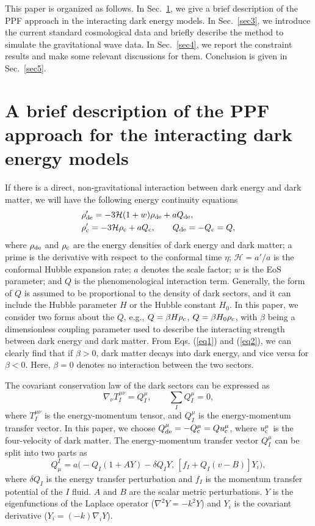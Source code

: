 \documentclass[aps,prd,nofootinbib,amsmath,amssymb,superscriptaddress,twocolumn,10pt]{revtex4}%
\begin{document}
This paper is organized as follows. In Sec.~\ref{sec2}, we give a brief description of the PPF approach in the interacting dark energy models. In Sec.~\ref{sec3}, we introduce the current standard cosmological data and briefly describe the method to simulate the gravitational wave data. In Sec.~\ref{sec4}, we report the constraint results and make some relevant discussions for them. Conclusion is given in Sec.~\ref{sec5}.


\section{A brief description of the PPF approach for the interacting dark energy models}\label{sec2}

If there is a direct, non-gravitational interaction between dark energy and dark matter, we will have the following energy continuity equations
\begin{align}
&\rho'_{\rm de} = -3\mathcal{H}(1+w)\rho_{\rm de}+ aQ_{\rm de},\label{eq1}\\
&\rho'_{\rm c} = -3\mathcal{H}\rho_{\rm c}+aQ_{\rm c},~~~~~~Q_{\rm de}=-Q_{\rm c}=Q,\label{eq2}
\end{align}
where $\rho_{\rm de}$ and $\rho_{\rm c}$ are the energy densities of dark energy and dark matter; a prime is the derivative with respect to the conformal time $\eta$; $\mathcal{H}=a'/a$ is the conformal Hubble expansion rate; $a$ denotes the scale factor; $w$ is the EoS parameter; and $Q$ is the phenomenological interaction term. Generally, the form of $Q$ is assumed to be proportional to the density of dark sectors, and it can include the Hubble parameter $H$ or the Hubble constant $H_{0}$. In this paper, we consider two forms about the $Q$, e.g., $Q=\beta H \rho_{\rm c}$, $Q=\beta H_{0} \rho_{\rm c}$,  with $\beta$ being a dimensionless coupling parameter used to describe the interacting strength between dark energy and dark matter. From Eqs. (\ref{eq1}) and (\ref{eq2}), we can clearly find that if $\beta>0$, dark matter decays into dark energy, and vice versa for $\beta<0$. Here, $\beta=0$ denotes no interaction between the two sectors.


The covariant conservation law of the dark sectors can be expressed as
\begin{equation}
\label{eqn:energyexchange} \nabla_\nu T^{\mu\nu}_I = Q^\mu_I, \quad\quad
 \sum_I Q^\mu_I = 0,
\end{equation}
where $T^{\mu\nu}_I$ is the energy-momentum tensor, and $Q^\mu_I$ is the energy-momentum transfer vector. In this paper, we choose $Q^\mu_{\rm de}=-Q^\mu_{\rm c}=Qu^\mu_{\rm c}$, where $u^\mu_{\rm c}$ is the four-velocity of dark matter. The energy-momentum transfer vector $Q^\mu_I$ can be split into two parts as
\begin{equation}
Q^I_\mu  = a\big( -Q_I(1+AY) - \delta Q_IY,\,[ f_I+ Q_I (v-B)]Y_i\big),\label{eq:Qenergy}
\end{equation}
where $\delta Q_I$ is the energy transfer perturbation and $f_I$ is the momentum transfer potential of the $I$ fluid. $A$ and $B$ are the scalar metric perturbations. $Y$ is the eigenfunctions of the Laplace operator ($\nabla^{2}Y=-k^{2}Y$) and $Y_i$ is the covariant derivative ($Y_{i}=(-k)\nabla_{i}Y$).
\end{document}
